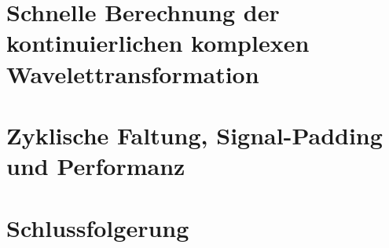 \begin{refsection}
\section{Schnelle Berechnung der kontinuierlichen komplexen Wavelettransformation}


\section{Zyklische Faltung, Signal-Padding und Performanz}

\section{Schlussfolgerung}

\printbibliography[heading=subbibliography]
\end{refsection}
